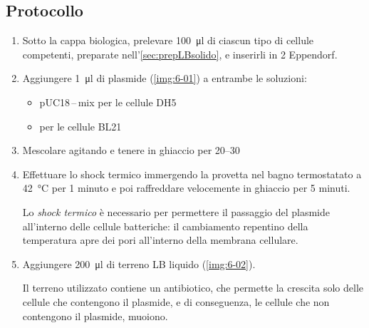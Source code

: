 \subsection{Protocollo}
\begin{enumerate}
	\item Sotto la cappa biologica, prelevare \qty{100}{\micro\litre} di ciascun tipo di cellule competenti, preparate nell'\autoref{sec:prepLBsolido}, e inserirli in 2 \foreignlanguage{german}{Eppendorf}.
	\item Aggiungere \qty{1}{\micro\litre} di plasmide (\autoref{img:6-01}) a entrambe le soluzioni:
	      \begin{itemize}[person]
		      \item pUC18\,--\,mix per le cellule DH5\textalpha
		      \item {} per le cellule BL21
	      \end{itemize}
	\item Mescolare agitando e tenere in ghiaccio per \qtyrange{20}{30}{\min}
	\item Effettuare lo shock termico immergendo la provetta nel bagno termostatato a \qty{42}{\celsius} per 1 minuto e poi raffreddare velocemente in ghiaccio per 5 minuti.
	      \begin{myBox}
		      Lo \textit{shock termico} è necessario per permettere il passaggio del plasmide all’interno delle cellule batteriche: il cambiamento repentino della temperatura apre dei pori all’interno della membrana cellulare.
	      \end{myBox}
	\item Aggiungere \qty{200}{\micro\litre} di terreno LB liquido (\autoref{img:6-02}).
	      \begin{Note}
		      Il terreno utilizzato contiene un antibiotico, che permette la crescita solo delle cellule che contengono il plasmide, e di conseguenza, le cellule che non contengono il plasmide, muoiono.


\end{Note}
\end{enumerate}
